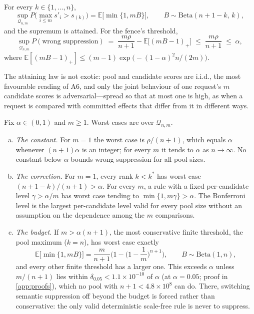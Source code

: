 \begin{theorem}\label{thm:tight}
For every $k\in\{1,\dots,n\}$,
\[
\sup_{\mathcal{Q}_{n,m}} P\Big(\max_{i\le m}s'_i>s_{(k)}\Big)=\mathbb{E}\big[\min\{1,mB\}\big],\qquad B\sim\mathrm{Beta}(n+1-k,\,k),
\]
and the supremum is attained. For the fence's threshold,
\[
\sup_{\mathcal{Q}_{n,m}}P(\text{wrong suppression})\;=\;\frac{m\rho}{n+1}-\mathbb{E}\big[(mB-1)_+\big]\;\le\;\frac{m\rho}{n+1}\;\le\;\alpha,
\]
where $\mathbb{E}[(mB-1)_+]\le(m-1)\exp\!\big(-(1-\alpha)^2n/(2m)\big)$.
\end{theorem}

The attaining law is not exotic: pool and candidate scores are i.i.d., the most favourable reading of A6, and only the joint behaviour of one request's $m$ candidate scores is adversarial---spread so that at most one is high, as when a request is compared with committed effects that differ from it in different ways.

\begin{corollary}\label{cor:tight}
Fix $\alpha\in(0,1)$ and $m\ge1$. Worst cases are over $\mathcal{Q}_{n,m}$.
\begin{enumerate}[(a),leftmargin=*,itemsep=1pt]
\item \emph{The constant.} For $m=1$ the worst case is $\rho/(n+1)$, which equals $\alpha$ whenever $(n+1)\alpha$ is an integer; for every $m$ it tends to $\alpha$ as $n\to\infty$. No constant below $\alpha$ bounds wrong suppression for all pool sizes.
\item \emph{The correction.} For $m=1$, every rank $k<k^\ast$ has worst case $(n+1-k)/(n+1)>\alpha$. For every $m$, a rule with a fixed per-candidate level $\gamma>\alpha/m$ has worst case tending to $\min\{1,m\gamma\}>\alpha$. The Bonferroni level is the largest per-candidate level valid for every pool size without an assumption on the dependence among the $m$ comparisons.
\item \emph{The budget.} If $m>\alpha(n+1)$, the most conservative finite threshold, the pool maximum ($k=n$), has worst case exactly
\[
\mathbb{E}\big[\min\{1,mB\}\big]=\frac{m}{n+1}\Big(1-\Big(1-\frac1m\Big)^{n+1}\Big),\qquad B\sim\mathrm{Beta}(1,n),
\]
and every other finite threshold has a larger one. This exceeds $\alpha$ unless $m/(n+1)$ lies within $\delta_{0.05}<1.1\times10^{-10}$ of $\alpha$ (at $\alpha=0.05$; proof in \ref{app:proofs}), which no pool with $n+1<4.8\times10^8$ can do. There, switching semantic suppression off beyond the budget is forced rather than conservative: the only valid deterministic scale-free rule is never to suppress.
\end{enumerate}
\end{corollary}


